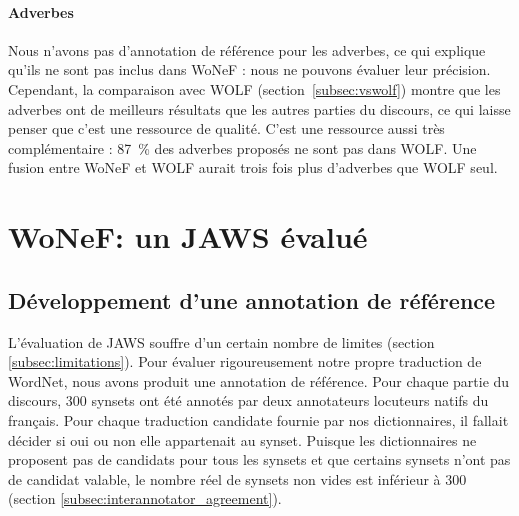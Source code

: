 \paragraph{Adverbes}

Nous n'avons pas d'annotation de référence pour les adverbes, ce qui explique qu'ils ne sont pas inclus dans WoNeF : nous ne pouvons évaluer leur précision. Cependant, la comparaison avec WOLF (section~\ref{subsec:vswolf}) montre que les adverbes ont de meilleurs résultats que les autres parties du discours, ce qui laisse penser que c'est une ressource de qualité. C'est une ressource aussi très complémentaire : 87~\% des adverbes proposés ne sont pas dans WOLF. Une fusion entre WoNeF et WOLF aurait trois fois plus d'adverbes que WOLF seul.

\section{WoNeF: un JAWS évalué}
\label{sec:evaluating_jaws}

\subsection{Développement d'une annotation de référence}
\label{subsec:gold_standard}

L'évaluation de JAWS souffre d'un certain nombre de limites (section \ref{subsec:limitations}). Pour évaluer rigoureusement notre propre traduction de WordNet, nous avons produit une annotation de référence. Pour chaque partie du discours, 300 synsets ont été annotés par deux annotateurs locuteurs natifs du français. Pour chaque traduction candidate fournie par nos dictionnaires, il fallait décider si oui ou non elle appartenait au synset. Puisque les dictionnaires ne proposent pas de candidats pour tous les synsets et que certains synsets n'ont pas de candidat valable, le nombre réel de synsets non vides est inférieur à 300 (section \ref{subsec:interannotator_agreement}).

